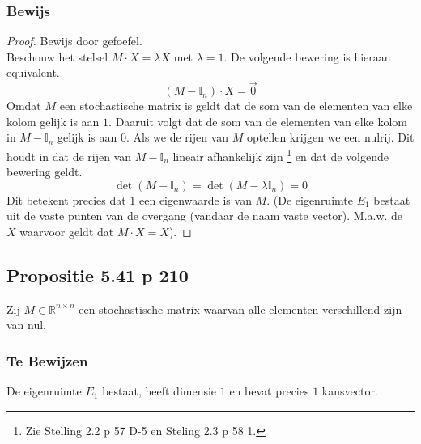 \documentclass[lineaire_algebra_oplossingen.tex]{subfiles}
\begin{document}
\subsubsection*{Bewijs}
\begin{proof}
Bewijs door gefoefel.\\
Beschouw het stelsel $M\cdot X = \lambda X$ met $\lambda = 1$. De volgende bewering is hieraan equivalent.
\[
(M-\mathbb{I}_n)\cdot X = \vec{0}
\]
Omdat $M$ een stochastische matrix is geldt dat de som van de elementen van elke kolom gelijk is aan $1$. Daaruit volgt dat de som van de elementen van elke kolom in $M-\mathbb{I}_n$ gelijk is aan $0$. Als we de rijen van $M$ optellen krijgen we een nulrij. Dit houdt in dat de rijen van $M-\mathbb{I}_n$ lineair afhankelijk zijn \footnote{Zie Stelling 2.2 p 57 D-5 en Steling 2.3 p 58 1.} en dat de volgende bewering geldt.
\[
\det(M - \mathbb{I}_n) = \det(M - \lambda\mathbb{I}_n) = 0
\]
Dit betekent precies dat $1$ een eigenwaarde is van $M$.
(De eigenruimte $E_1$ bestaat uit de vaste punten van de overgang (vandaar de naam vaste vector). M.a.w. de $X$ waarvoor geldt dat $M\cdot X = X$).
\end{proof}


\subsection{Propositie 5.41 p 210}
\label{5.41}
Zij $M\in \mathbb{R}^{n\times n}$ een stochastische matrix waarvan alle elementen verschillend zijn van nul.

\subsubsection*{Te Bewijzen}
De eigenruimte $E_1$ bestaat, heeft dimensie $1$ en bevat precies $1$ kansvector.
\end{document}
